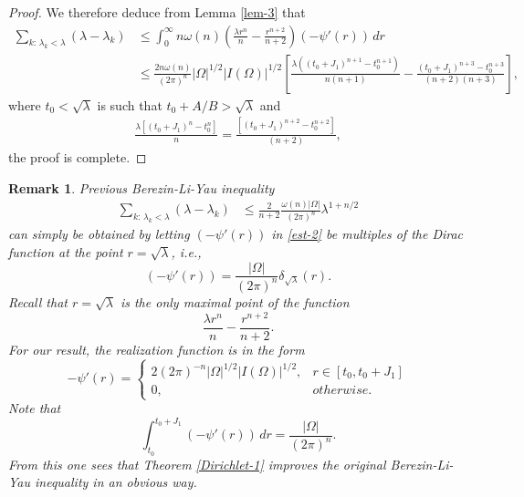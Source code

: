 \documentclass[11pt,twoside, leqno]{article}
\newtheorem{rem}[thm]{Remark}
\numberwithin{equation}{section}
\begin{document}
\begin{proof}
We therefore deduce from Lemma \ref{lem-3} that
\begin{align}\label{est-2}
\sum_{k:\,\lambda_k<\lambda}(\lambda-\lambda_k)&\le \int_0^\infty n\omega(n)\left(\frac{\lambda r^n}{n} -\frac{r^{n+2}}{n+2}\right) (-\psi'(r))\,dr\nonumber\\
&\le  \frac{2n\omega(n)}{(2\pi)^{n}} |\Omega|^{1/2}|I(\Omega)|^{1/2}    \left[\frac{\lambda ((t_0+J_1)^{n+1}-t_0^{n+1})}{n(n+1)}-\frac{(t_0+J_1)^{n+3}-t_0^{n+3}}{(n+2)(n+3)}\right],
\end{align}
where  $t_0<\sqrt\lambda$ is such that  $t_0+A/B>\sqrt{\lambda}$ and
\begin{align*}
\frac{\lambda \left[(t_0+J_1)^{n}-t_0^{n}\right]}{n}=\frac{\left[(t_0+J_1)^{n+2}-t_0^{n+2}\right]}{(n+2)},
\end{align*}
the proof is complete.
\end{proof}
\begin{rem}\label{remark-improvement}\rm
Previous Berezin-Li-Yau inequality
\begin{align*}
\sum_{k:\,\lambda_k<\lambda}(\lambda-\lambda_k)&\le  \frac{2}{n+2} \frac{\omega(n)|\Omega|}{(2\pi)^{n}}\lambda^{1+n/2}
\end{align*}
can simply be obtained  by letting $(-\psi'(r))$ in \eqref{est-2} be multiples of the Dirac function at the point $r=\sqrt\lambda$, i.e.,
$$(-\psi'(r))=\frac{|\Omega|}{(2\pi)^n}\delta_{\sqrt\lambda}(r).$$
Recall that $r=\sqrt\lambda$ is the {\em only} maximal point of the function
$$\frac{\lambda r^n}{n} -\frac{r^{n+2}}{n+2}.$$
For our result, the realization function is in the form
$$
-\psi'(r)=\begin{cases}
2(2\pi)^{-n}|\Omega|^{1/2}|I(\Omega)|^{1/2},&  r\in [t_0,t_0+J_1]\\
0, & otherwise.
\end{cases}$$
Note that
$$\int_{t_0}^{t_0+J_1} (-\psi'(r))\,dr=\frac{|\Omega|}{(2\pi)^n}.$$
From this one sees that Theorem \ref{Dirichlet-1} improves
the original Berezin-Li-Yau inequality in an obvious way.
\end{rem}
%
%
\end{document}
